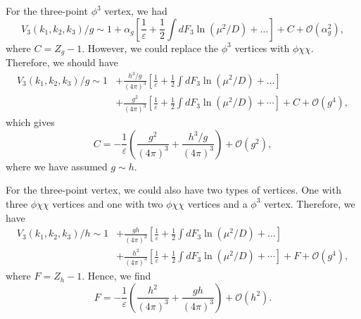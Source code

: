 \begin{enumerate}[label=\alph*)]
\begin{solution}
        For the three-point $\phi^3$ vertex, we had
        \begin{equation}
            V_3(k_1, k_2,k_3)/g \sim 1 + \alpha_g\left[\frac{1}{\varepsilon}+\frac{1}{2}\int dF_3\ln(\mu^2/D) + \dots\right] +C + \mathcal{O}(\alpha_g^2),
        \end{equation}
        where $C = Z_g -1$. However, we could replace the $\phi^3$ vertices with $\phi\chi\chi$. Therefore, we should have 
        \begin{equation}
            \begin{aligned}
                V_3(k_1, k_2,k_3)/g \sim 1 &+ \frac{h^3/g}{(4\pi)^3}\left[\frac{1}{\varepsilon}+\frac{1}{2}\int dF_3\ln(\mu^2/D) + \dots\right] \\
                &+\frac{g^2}{(4\pi)^3}\left[\frac{1}{\varepsilon}+\frac{1}{2}\int dF_3\ln(\mu^2/D) + \cdots\right] +C + \mathcal{O}(g^4),
            \end{aligned}
        \end{equation}
        which gives
        \begin{equation}
            C = - \frac{1}{\varepsilon}\left(\frac{g^2}{(4\pi)^3} + \frac{h^3/g}{(4\pi)^3}\right) + \mathcal{O}(g^2),
        \end{equation}
        where we have assumed $g\sim h$.
        
        For the three-point vertex, we could also have two types of vertices. One with three $\phi\chi\chi$ vertices and one with two $\phi\chi\chi$ vertices and a $\phi^3$ vertex. Therefore, we have
        \begin{equation}
            \begin{aligned}
                V_3(k_1, k_2,k_3)/h \sim 1 &+ \frac{gh}{(4\pi)^3}\left[\frac{1}{\varepsilon}+\frac{1}{2}\int dF_3\ln(\mu^2/D) + \dots\right] \\
                &+\frac{h^2}{(4\pi)^3}\left[\frac{1}{\varepsilon}+\frac{1}{2}\int dF_3\ln(\mu^2/D) + \cdots\right] +F + \mathcal{O}(g^4),
            \end{aligned}
        \end{equation}
        where $F = Z_h -1$. Hence, we find
        \begin{equation}
            F = - \frac{1}{\varepsilon}\left(\frac{h^2}{(4\pi)^3} + \frac{gh}{(4\pi)^3}\right) + \mathcal{O}(h^2).
        \end{equation}
        
    \end{solution}


\end{enumerate}
